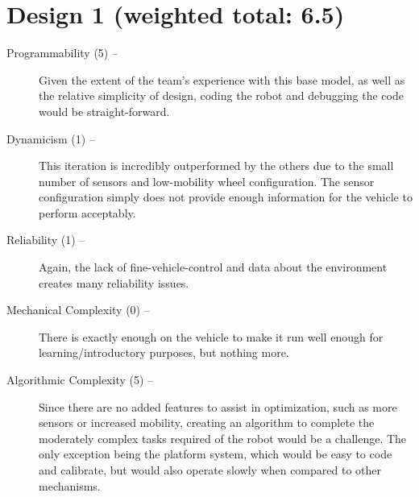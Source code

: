 \documentclass[11pt]{report}
\begin{document}
\section{Design 1 (weighted total: 6.5)}\label{matrixdesign1}
\begin{greylineformat}
\begin{description}
    \item[Programmability (5) --]Given the extent of the team's experience with this base model, as well as the relative simplicity of design, coding the robot and debugging the code would be straight-forward.
    \item[Dynamicism (1) --]This iteration is incredibly outperformed by the others due to the small number of sensors and low-mobility wheel configuration. The sensor configuration simply does not provide enough information for the vehicle to perform acceptably.
    \item[Reliability (1) --]Again, the lack of fine-vehicle-control and data about the environment creates many reliability issues.
    \item[Mechanical Complexity (0) --]There is exactly enough on the vehicle to make it run well enough for learning/introductory purposes, but nothing more.
    \item[Algorithmic Complexity (5) --]Since there are no added features to assist in optimization, such as more sensors or increased mobility, creating an algorithm to complete the moderately complex tasks required of the robot would be a challenge. The only exception being the platform system, which would be easy to code and calibrate, but would also operate slowly when compared to other mechanisms.
\end{description}
\end{greylineformat}
\end{document}

